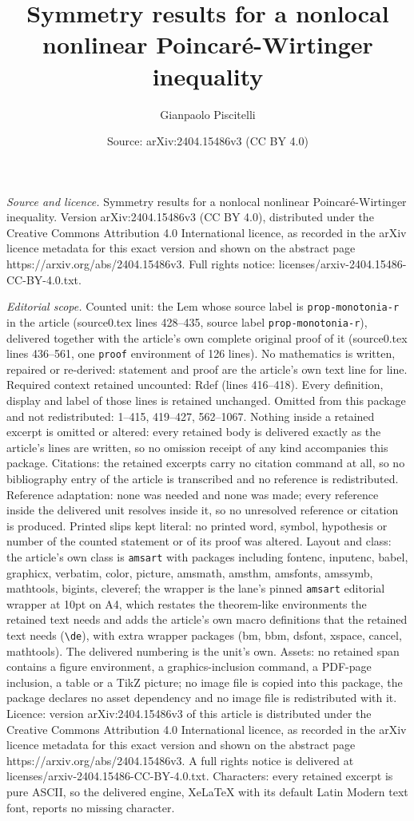 \documentclass[10pt,a4paper]{amsart}
\title[Symmetry results for a nonlocal nonlinear Poincar\'e-Wirting]{Symmetry results for a nonlocal nonlinear Poincar\'e-Wirtinger inequality}
\author{Gianpaolo Piscitelli}
\date{Source: arXiv:2404.15486v3 (CC BY 4.0)}
\begin{document}
\maketitle

\noindent\emph{Source and licence.} Symmetry results for a nonlocal nonlinear Poincar\'e-Wirtinger inequality. Version arXiv:2404.15486v3 (CC BY 4.0), distributed under the Creative Commons Attribution 4.0 International licence, as recorded in the arXiv licence metadata for this exact version and shown on the abstract page https://arxiv.org/abs/2404.15486v3. Full rights notice: licenses/arxiv-2404.15486-CC-BY-4.0.txt.\par\smallskip

\noindent\textit{Editorial scope.} Counted unit: the Lem whose source label is \texttt{prop-monotonia-r} in the article (source0.tex lines 428--435, source label \texttt{prop-monotonia-r}), delivered together with the article's own complete original proof of it (source0.tex lines 436--561, one \texttt{proof} environment of 126 lines). No mathematics is written, repaired or re-derived: statement and proof are the article's own text line for line. Required context retained uncounted: Rdef (lines 416--418). Every definition, display and label of those lines is retained unchanged. Omitted from this package and not redistributed: 1--415, 419--427, 562--1067. Nothing inside a retained excerpt is omitted or altered: every retained body is delivered exactly as the article's lines are written, so no omission receipt of any kind accompanies this package. Citations: the retained excerpts carry no citation command at all, so no bibliography entry of the article is transcribed and no reference is redistributed. Reference adaptation: none was needed and none was made; every reference inside the delivered unit resolves inside it, so no unresolved reference or citation is produced. Printed slips kept literal: no printed word, symbol, hypothesis or number of the counted statement or of its proof was altered. Layout and class: the article's own class is \texttt{amsart} with packages including fontenc, inputenc, babel, graphicx, verbatim, color, picture, amsmath, amsthm, amsfonts, amssymb, mathtools, bigints, cleveref; the wrapper is the lane's pinned \texttt{amsart} editorial wrapper at 10pt on A4, which restates the theorem-like environments the retained text needs and adds the article's own macro definitions that the retained text needs (\texttt{\textbackslash de}), with extra wrapper packages (bm, bbm, dsfont, xspace, cancel, mathtools). The delivered numbering is the unit's own. Assets: no retained span contains a figure environment, a graphics-inclusion command, a PDF-page inclusion, a table or a TikZ picture; no image file is copied into this package, the package declares no asset dependency and no image file is redistributed with it. Licence: version arXiv:2404.15486v3 of this article is distributed under the Creative Commons Attribution 4.0 International licence, as recorded in the arXiv licence metadata for this exact version and shown on the abstract page https://arxiv.org/abs/2404.15486v3. A full rights notice is delivered at licenses/arxiv-2404.15486-CC-BY-4.0.txt. Characters: every retained excerpt is pure ASCII, so the delivered engine, XeLaTeX with its default Latin Modern text font, reports no missing character.
\end{document}
